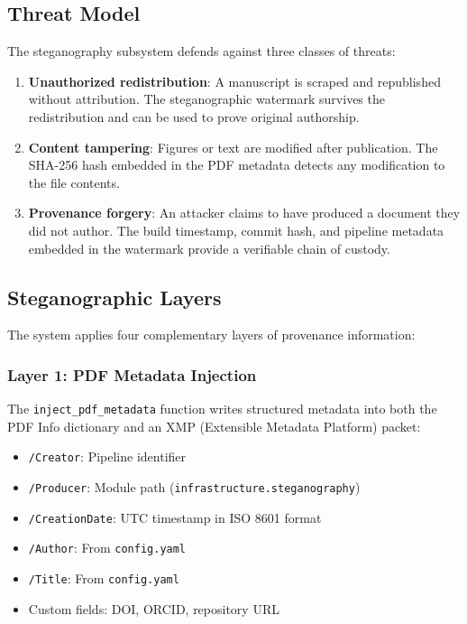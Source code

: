 \documentclass[
]{article}
\providecommand{\tightlist}{%
  \setlength{\itemsep}{0pt}\setlength{\parskip}{0pt}}
\begin{document}
\subsection{Threat Model}\label{threat-model}

The steganography subsystem defends against three classes of threats:

\begin{enumerate}
\def\labelenumi{\arabic{enumi}.}
\tightlist
\item
  \textbf{Unauthorized redistribution}: A manuscript is scraped and
  republished without attribution. The steganographic watermark survives
  the redistribution and can be used to prove original authorship.
\item
  \textbf{Content tampering}: Figures or text are modified after
  publication. The SHA-256 hash embedded in the PDF metadata detects any
  modification to the file contents.
\item
  \textbf{Provenance forgery}: An attacker claims to have produced a
  document they did not author. The build timestamp, commit hash, and
  pipeline metadata embedded in the watermark provide a verifiable chain
  of custody.
\end{enumerate}

\subsection{Steganographic Layers}\label{steganographic-layers}

The system applies four complementary layers of provenance information:

\subsubsection{Layer 1: PDF Metadata
Injection}\label{layer-1-pdf-metadata-injection}

The \texttt{inject\_pdf\_metadata} function writes structured metadata
into both the PDF Info dictionary and an XMP (Extensible Metadata
Platform) packet:

\begin{itemize}
\tightlist
\item
  \texttt{/Creator}: Pipeline identifier
\item
  \texttt{/Producer}: Module path
  (\texttt{infrastructure.steganography})
\item
  \texttt{/CreationDate}: UTC timestamp in ISO 8601 format
\item
  \texttt{/Author}: From \texttt{config.yaml}
\item
  \texttt{/Title}: From \texttt{config.yaml}
\item
  Custom fields: DOI, ORCID, repository URL
\end{itemize}
\end{document}
